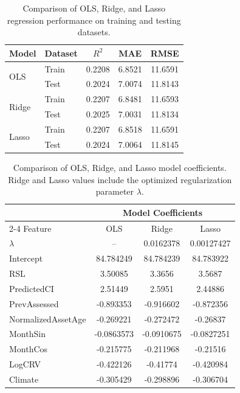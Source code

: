 \documentclass[NewProceedings,letterpaper,NoPageNumbers,NoLineNumbers, DoubleSpace]{ascelike-new}
\begin{document}
\begin{table}[htbp]
\centering 
\caption{Comparison of OLS, Ridge, and Lasso regression performance on training and testing datasets.} 
\begin{tabular}{llccc}
\hline
Model & Dataset & $R^2$ & MAE & RMSE \\
\hline
\multirow{2}{*}{OLS}
& Train & 0.2208 & 6.8521 & 11.6591 \\
& Test & 0.2024 & 7.0074 & 11.8143 \\
\multirow{2}{*}{Ridge}
& Train & 0.2207 & 6.8481 & 11.6593 \\
& Test & 0.2025 & 7.0031 & 11.8134 \\
\multirow{2}{*}{Lasso}
& Train & 0.2207 & 6.8518 & 11.6591 \\
& Test & 0.2024 & 7.0064 & 11.8145 \\
\hline
\end{tabular}
\label{tab:performance_comparison}
\end{table}


\begin{table}[htbp]
\centering
\caption{Comparison of OLS, Ridge, and Lasso model coefficients. Ridge and Lasso values include the optimized regularization parameter $\lambda$.}
\begin{tabular}{lccc}
\toprule
& \multicolumn{3}{c}{Model Coefficients} \\
\cmidrule(lr){2-4}
Feature & OLS & Ridge & Lasso \\
\midrule
$\lambda$ & -- & 0.0162378 & 0.00127427 \\
Intercept & 84.784249 & 84.784239 & 84.783922 \\
RSL & 3.50085 & 3.3656 & 3.5687 \\
PredictedCI & 2.51449 & 2.5951 & 2.44886 \\
PrevAssessed & -0.893353 & -0.916602 & -0.872356 \\
NormalizedAssetAge & -0.269221 & -0.272472 & -0.26837 \\
MonthSin & -0.0863573 & -0.0910675 & -0.0827251 \\
MonthCos & -0.215775 & -0.211968 & -0.21516 \\
LogCRV & -0.422126 & -0.41774 & -0.420984 \\
Climate & -0.305429 & -0.298896 & -0.306704 \\
\bottomrule
\end{tabular}
\label{tab:coefficient_comparison}
\end{table}
\end{document}
